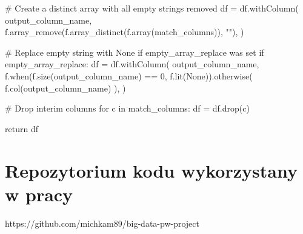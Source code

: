 \documentclass[
  letterpaper,
  DIV=11,
  numbers=noendperiod]{scrreprt}
\newenvironment{Shaded}{\begin{snugshade}}{\end{snugshade}}
\newcommand{\CommentTok}[1]{\textcolor[rgb]{0.37,0.37,0.37}{#1}}
\newcommand{\ControlFlowTok}[1]{\textcolor[rgb]{0.00,0.23,0.31}{#1}}
\newcommand{\DecValTok}[1]{\textcolor[rgb]{0.68,0.00,0.00}{#1}}
\newcommand{\KeywordTok}[1]{\textcolor[rgb]{0.00,0.23,0.31}{#1}}
\newcommand{\NormalTok}[1]{\textcolor[rgb]{0.00,0.23,0.31}{#1}}
\newcommand{\OperatorTok}[1]{\textcolor[rgb]{0.37,0.37,0.37}{#1}}
\newcommand{\StringTok}[1]{\textcolor[rgb]{0.13,0.47,0.30}{#1}}
\newcommand{\VariableTok}[1]{\textcolor[rgb]{0.07,0.07,0.07}{#1}}
\begin{document}
\begin{Shaded}
\begin{Highlighting}[]
    \CommentTok{\# Create a distinct array with all empty strings removed}
\NormalTok{    df }\OperatorTok{=}\NormalTok{ df.withColumn(}
\NormalTok{        output\_column\_name,}
\NormalTok{        f.array\_remove(f.array\_distinct(f.array(match\_columns)), }\StringTok{""}\NormalTok{),}
\NormalTok{    )}

    \CommentTok{\# Replace empty string with None if empty\_array\_replace was set}
    \ControlFlowTok{if}\NormalTok{ empty\_array\_replace:}
\NormalTok{        df }\OperatorTok{=}\NormalTok{ df.withColumn(}
\NormalTok{            output\_column\_name,}
\NormalTok{            f.when(f.size(output\_column\_name) }\OperatorTok{==} \DecValTok{0}\NormalTok{, f.lit(}\VariableTok{None}\NormalTok{)).otherwise(}
\NormalTok{                f.col(output\_column\_name)}
\NormalTok{            ),}
\NormalTok{        )}

    \CommentTok{\# Drop interim columns}
    \ControlFlowTok{for}\NormalTok{ c }\KeywordTok{in}\NormalTok{ match\_columns:}
\NormalTok{        df }\OperatorTok{=}\NormalTok{ df.drop(c)}

    \ControlFlowTok{return}\NormalTok{ df}
\end{Highlighting}
\end{Shaded}

\hypertarget{repozytorium-kodu-wykorzystany-w-pracy}{%
\section{Repozytorium kodu wykorzystany w
pracy}\label{repozytorium-kodu-wykorzystany-w-pracy}}

https://github.com/michkam89/big-data-pw-project


\printbibliography
\end{document}
